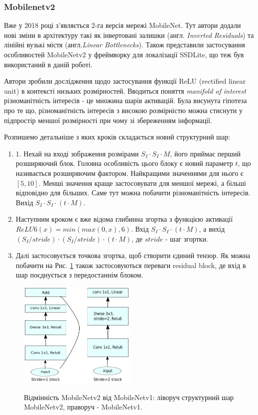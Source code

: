 \subsubsection{Mobilenetv2}

Вже у 2018 році з'являється 2-га версія мережі MobileNet. Тут автори додали нові зміни в
архітектуру такі як інвертовані залишки (англ. \textit{Inverted Residuals}) та
лінійні вузькі містя (англ.\textit{Linear Bottlenecks}). Також представили застосування
особливостей MobileNetv2 у фреймворку для локалізації SSDLite, що теж був використаний
в даній роботі.

Автори зробили дослідження щодо застосування функції ReLU (rectified linear unit) в
контексті низьких розмірностей. Вводиться поняття \textit{manifold of interest}
різноманітність інтересів - це множина шарів активацій. Була висунута гіпотеза про те що,
різноманітність інтересів з високою розмірністю можна стиснути у підпростір меншої розмірності при
чому зі збереженням інформації.

Розпишемо детальніше з яких кроків складається новий структурний шар:


\begin{enumerate}
    \item   1. Нехай на вході зображення розмірами $S_I · S_I · M$, його приймає перший розширяючий блок.
          Головна особливість цього блоку є новий параметр $t$, що називається розширяючим фактором.
          Найкращими значеннями для нього є $[5,10]$. Менші значення краще застосовувати для меншої мережі,
          а більші відповідно для більших. Саме тут можна побачити різноманітність інтересів.
          Вихід $S_I · S_I · (t·M)$.
    \item   Наступним кроком є вже відома глибинна згортка з функцією активації $ReLU6(x) =  min(max(0,x),6)$.
          Вхід $S_I · S_I · (t·M)$, а вихід $(S_I/stride) · (S_I/stride) · (t·M)$, де  $stride$ - шаг згортки.
    \item   Далі застосовується точкова згортка, щоб створити єдиний тензор. Як можна побачити на
          Рис. \ref{fig:cnn:mobilenetv2_layer} також застосовуються переваги residual block, де вхід в шар
          поєднується з передостаннім блоком.
\end{enumerate}


\begin{figure}[H]
    \centering
    \includegraphics[width=0.5\textwidth]{images/cnn_mobilenetv2_layer}  \cite{mobilenetv2}
    \caption{Відмінність MobileNetv2 від MobileNetv1: ліворуч структурний шар MobileNetv2,
        праворуч - MobileNetv1.
        \label{fig:cnn:mobilenetv2_layer}
    }
\end{figure}

